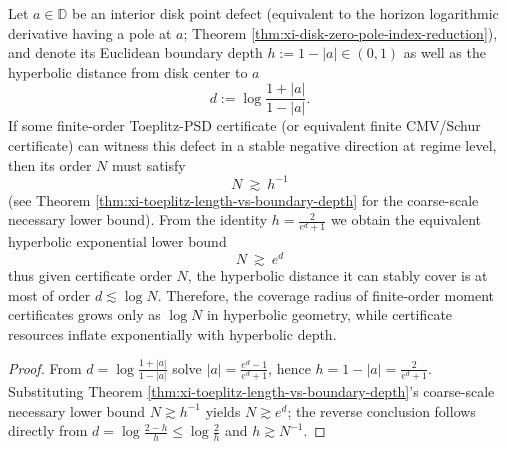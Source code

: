 \begin{corollary}\label{cor:xi-certificate-complexity-hyperbolic-exponential-law}
Let \(a\in\mathbb{D}\) be an interior disk point defect (equivalent to the horizon logarithmic derivative having a pole at \(a\); Theorem \ref{thm:xi-disk-zero-pole-index-reduction}), and denote its Euclidean boundary depth
\(
h:=1-|a|\in(0,1)
\)
as well as the hyperbolic distance from disk center to \(a\)
\[
d:=\log\frac{1+|a|}{1-|a|}.
\]
If some finite-order Toeplitz-PSD certificate (or equivalent finite CMV/Schur certificate) can witness this defect in a stable negative direction at regime level, then its order \(N\) must satisfy
\[
\boxed{\;
N\ \gtrsim\ h^{-1}\;}
\]
(see Theorem \ref{thm:xi-toeplitz-length-vs-boundary-depth} for the coarse-scale necessary lower bound).
From the identity \(h=\frac{2}{e^{d}+1}\) we obtain the equivalent hyperbolic exponential lower bound
\[
\boxed{\;
N\ \gtrsim\ e^{d}\;}
\]
thus given certificate order \(N\), the hyperbolic distance it can stably cover is at most of order \(d\lesssim \log N\).
Therefore, the coverage radius of finite-order moment certificates grows only as \(\log N\) in hyperbolic geometry, while certificate resources inflate exponentially with hyperbolic depth.
\end{corollary}

\begin{proof}
From \(d=\log\frac{1+|a|}{1-|a|}\) solve
\(
|a|=\frac{e^{d}-1}{e^{d}+1}
\), hence
\(
h=1-|a|=\frac{2}{e^{d}+1}
\).
Substituting Theorem \ref{thm:xi-toeplitz-length-vs-boundary-depth}'s coarse-scale necessary lower bound \(N\gtrsim h^{-1}\) yields \(N\gtrsim e^{d}\);
the reverse conclusion follows directly from \(d=\log\frac{2-h}{h}\le \log\frac{2}{h}\) and \(h\gtrsim N^{-1}\).
\end{proof}

